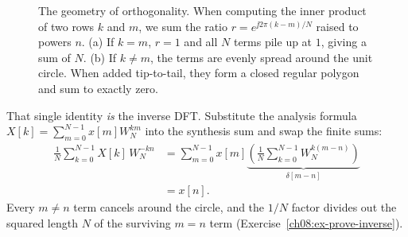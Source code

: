 \begin{figure}[htbp]
\centering
{}
\caption{The geometry of orthogonality. When computing the inner product of two rows $k$ and $m$, we sum the ratio $r = e^{\jj 2\pi (k-m)/N}$ raised to powers $n$. (a) If $k=m$, $r=1$ and all $N$ terms pile up at $1$, giving a sum of $N$. (b) If $k \neq m$, the terms are evenly spread around the unit circle. When added tip-to-tail, they form a closed regular polygon and sum to exactly zero.}
\label{ch08:fig-ortho}
\end{figure}


\begin{whybox}
That single identity \emph{is} the inverse DFT. Substitute the analysis formula
$X[k] = \sum_{m=0}^{N-1} x[m] W_N^{km}$ into the synthesis sum and swap the finite sums:
\begin{align*}
  \frac{1}{N}\sum_{k=0}^{N-1} X[k]\,W_N^{-kn}
  &= \sum_{m=0}^{N-1} x[m]\underbrace{\left(\frac{1}{N}\sum_{k=0}^{N-1} W_N^{k(m-n)}\right)}_{\delta[m-n]} \\
  &= x[n].
\end{align*}
Every $m \neq n$ term cancels around the circle, and the $1/N$ factor divides out the squared
length $N$ of the surviving $m=n$ term (Exercise~\ref{ch08:ex-prove-inverse}).
\end{whybox}

